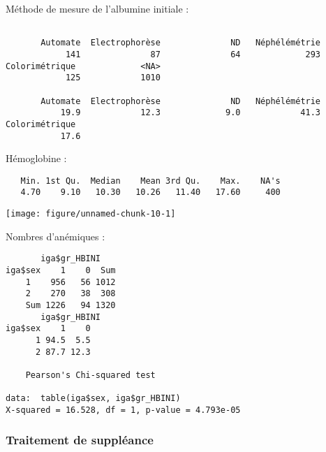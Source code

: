 \documentclass[11pt,a4paper]{article}\usepackage[]{graphicx}\usepackage[]{color}
\makeatletter
\def\maxwidth{ %
  \ifdim\Gin@nat@width>\linewidth
    \linewidth
  \else
    \Gin@nat@width
  \fi
}
\newenvironment{kframe}{%
 \def\at@end@of@kframe{}%
 \ifinner\ifhmode%
  \def\at@end@of@kframe{\end{minipage}}%
  \begin{minipage}{\columnwidth}%
 \fi\fi%
 \def\FrameCommand##1{\hskip\@totalleftmargin \hskip-\fboxsep
 \colorbox{shadecolor}{##1}\hskip-\fboxsep
     \hskip-\linewidth \hskip-\@totalleftmargin \hskip\columnwidth}%
 \MakeFramed {\advance\hsize-\width
   \@totalleftmargin\z@ \linewidth\hsize
   \@setminipage}}%
 {\par\unskip\endMakeFramed%
 \at@end@of@kframe}
\newenvironment{knitrout}{}{} %
\makeatother
\begin{document}
Méthode de mesure de l'albumine initiale :

\begin{knitrout}
\color{fgcolor}\begin{kframe}
\begin{verbatim}

       Automate  Electrophorèse              ND   Néphélémétrie 
            141              87              64             293 
Colorimétrique             <NA> 
            125            1010 

       Automate  Electrophorèse              ND   Néphélémétrie 
           19.9            12.3             9.0            41.3 
Colorimétrique  
           17.6 
\end{verbatim}
\end{kframe}
\end{knitrout}

Hémoglobine :

\begin{knitrout}
\color{fgcolor}\begin{kframe}
\begin{verbatim}
   Min. 1st Qu.  Median    Mean 3rd Qu.    Max.    NA's 
   4.70    9.10   10.30   10.26   11.40   17.60     400 
\end{verbatim}
\end{kframe}
\texttt{[image: figure/unnamed-chunk-10-1]} 

\end{knitrout}

Nombres d'anémiques :

\begin{knitrout}
\color{fgcolor}\begin{kframe}
\begin{verbatim}
       iga$gr_HBINI
iga$sex    1    0  Sum
    1    956   56 1012
    2    270   38  308
    Sum 1226   94 1320
       iga$gr_HBINI
iga$sex    1    0
      1 94.5  5.5
      2 87.7 12.3

	Pearson's Chi-squared test

data:  table(iga$sex, iga$gr_HBINI)
X-squared = 16.528, df = 1, p-value = 4.793e-05
\end{verbatim}
\end{kframe}
\end{knitrout}


    \subsubsection{Traitement de suppléance}
    
\end{document}
